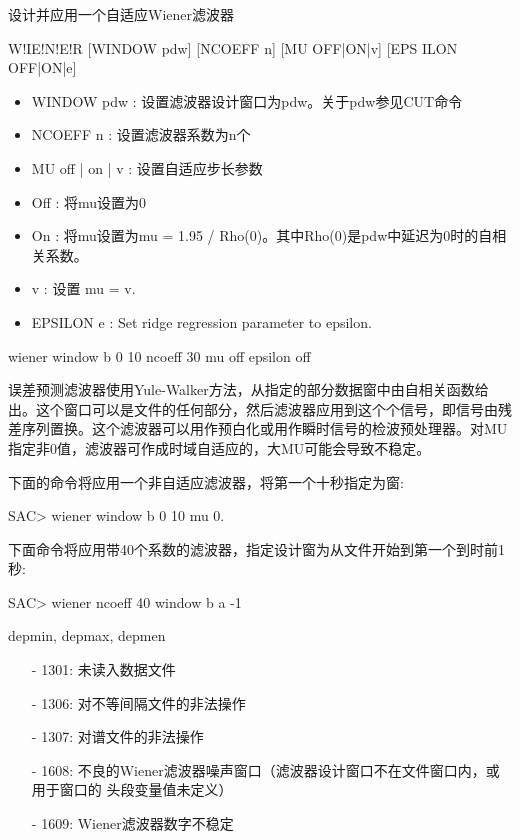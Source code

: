 \label{cmd:wiener}

设计并应用一个自适应Wiener滤波器

\begin{SACSTX}
W!IE!N!E!R [WINDOW pdw] [NCOEFF n] [MU OFF|ON|v] [EPS ILON OFF|ON|e]
\end{SACSTX}

\begin{itemize}
\item WINDOW pdw : 设置滤波器设计窗口为pdw。关于pdw参见CUT命令 
\item NCOEFF n : 设置滤波器系数为n个 
\item MU off | on | v : 设置自适应步长参数 
\item Off : 将mu设置为0 
\item On : 将mu设置为mu = 1.95 / Rho(0)。其中Rho(0)是pdw中延迟为0时的自相关系数。 
\item v : 设置 mu = v. 
\item EPSILON e :  Set ridge regression parameter to epsilon. 
\end{itemize}

\begin{SACDFT}
wiener window b 0 10 ncoeff 30 mu off epsilon off
\end{SACDFT}

误差预测滤波器使用Yule-Walker方法，从指定的部分数据窗中由自相关函数给出。这个窗口可以是文件的任何部分，然后滤波器应用到这个个信号，即信号由残差序列置换。这个滤波器可以用作预白化或用作瞬时信号的检波预处理器。对MU指定非0值，滤波器可作成时域自适应的，大MU可能会导致不稳定。

下面的命令将应用一个非自适应滤波器，将第一个十秒指定为窗:
\begin{SACCode}
SAC> wiener window b 0 10 mu 0.
\end{SACCode}

下面命令将应用带40个系数的滤波器，指定设计窗为从文件开始到第一个到时前1秒:
\begin{SACCode}
SAC> wiener ncoeff 40 window b a -1
\end{SACCode}

depmin, depmax, depmen

\begin{itemize}
\item[-]1301: 未读入数据文件
\item[-]1306: 对不等间隔文件的非法操作
\item[-]1307: 对谱文件的非法操作
\item[-]1608: 不良的Wiener滤波器噪声窗口（滤波器设计窗口不在文件窗口内，或用于窗口的
    头段变量值未定义）
\end{itemize}

\begin{itemize}
\item[-]1609: Wiener滤波器数字不稳定
\end{itemize}

